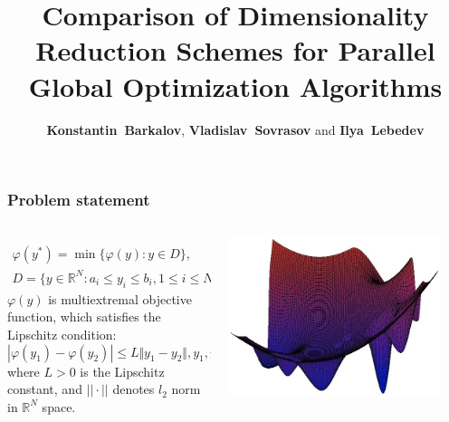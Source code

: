 \documentclass[aspectratio=1610]{beamer}
\title{Comparison of Dimensionality Reduction Schemes for Parallel Global Optimization Algorithms}
\author{\textbf{Konstantin~Barkalov}, \textbf{Vladislav~Sovrasov} and \textbf{Ilya~Lebedev}}
\institute{Lobachevsky State University of Nizhni Novgorod}
\date{}
\begin{document}
\begin{frame}
\titlepage
\end{frame}

\begin{frame}
  \frametitle{Problem statement}
  \begin{columns}
    \begin{column}{0.5\textwidth}
      \begin{displaymath}
        \begin{array}{cr}\\
          \varphi(y^*)=\min\{\varphi(y):y\in D\}, \\
          D=\{y\in \mathbb{R}^N:a_i\leq y_i\leq{b_i}, 1\leq{i}\leq{N}\}
        \end{array}
      \end{displaymath}
      \(\varphi(y)\) is multiextremal objective function, which satisfies the Lipschitz condition:
      \begin{displaymath}
        |\varphi(y_1)-\varphi(y_2)|\leq L\Vert y_1-y_2\Vert,y_1,y_2\in D,
      \end{displaymath}
      where \(L>0\) is the Lipschitz constant, and \(||\cdot||\) denotes \(l_2\) norm in \(\mathbb{R}^N\)
      space.
    \end{column}
    \begin{column}{0.5\textwidth}
      \centerline{\includegraphics[width=0.9\textwidth]{img/gkls.png}}
    \end{column}
  \end{columns}
\end{frame}
\end{document}
